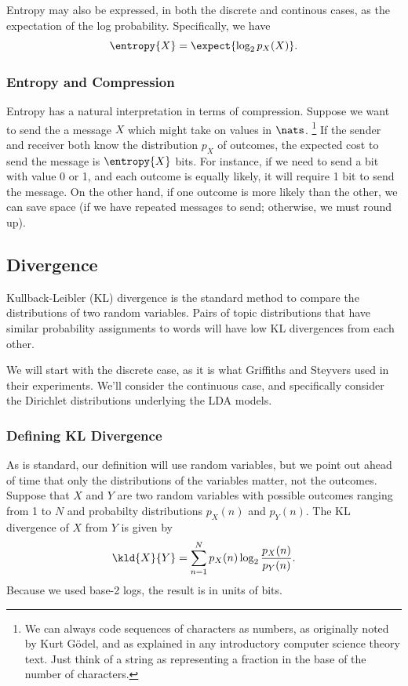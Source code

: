 Entropy may also be expressed, in both the discrete and continous cases,
as the expectation of the log probability.  Specifically, we have
%
\begin{equation}
\entropy{X} = \expect{\log_2 p_X(X)}.
\end{equation}


\subsubsection{Entropy and Compression}

Entropy has a natural interpretation in terms of compression.  Suppose
we want to send the a message $X$ which might take on values in
$\nats$.%
%
\footnote{We can always code sequences of characters as numbers, as
originally noted by Kurt G\"odel, and as explained in any introductory
computer science theory text.  Just think of a string as representing
a fraction in the base of the number of characters.}
%
If the sender and receiver both know the distribution $p_X$
of outcomes, the expected cost to send the message is $\entropy{X}$
bits.  For instance, if we need to send a bit with value 0 or 1, and
each outcome is equally likely, it will require 1 bit to send the
message.  On the other hand, if one outcome is more likely than the
other, we can save space (if we have repeated messages to send;
otherwise, we must round up).



\subsection{Divergence}\label{section:stats-divergence}

Kullback-Leibler (KL) divergence is the standard method to compare the
distributions of two random variables.  Pairs of topic distributions
that have similar probability assignments to words will have low KL
divergences from each other.

We will start with the discrete case, as it is what Griffiths and
Steyvers used in their experiments.  We'll consider the continuous
case, and specifically consider the Dirichlet distributions underlying
the LDA models.

\subsubsection{Defining KL Divergence}

As is standard, our definition will use random variables, but we point
out ahead of time that only the distributions of the variables matter,
not the outcomes.  Suppose that $X$ and $Y$ are two random variables
with possible outcomes ranging from 1 to $N$ and probabilty
distributions $p_X(n)$ and $p_Y(n)$.  The KL divergence of $X$ from
$Y$ is given by
%
\begin{equation}
\kld{X}{Y}
= \sum_{n=1}^N p_X(n) \log_2 \frac{p_X(n)}{p_Y(n)}.
\end{equation}
%
Because we used base-2 logs, the result is in units of bits.  

